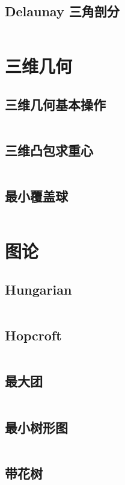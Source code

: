 \documentclass[titlepage,landscape,a4paper,10pt]{article}
\begin{document}
\begin{multicols}{2}
\begin{spacing}{0.8}
\subsection{Delaunay 三角剖分}
\inputminted{cpp}{improve/DelaunayTriangulation.cpp}

\section{三维几何}

\subsection{三维几何基本操作}
\inputminted{cpp}{merge/3DGeo.cpp}

\subsection{三维凸包求重心}
\inputminted{cpp}{src/三维凸包.cpp}

\subsection{最小覆盖球}
\inputminted{cpp}{src/最小覆盖球.cpp}

\section{图论}

\subsection{Hungarian}
\inputminted{cpp}{improve/Hungarian.cpp}

\subsection{Hopcroft}
\inputminted{cpp}{src/Hopcroft.cpp}

\subsection{最大团}
\inputminted{cpp}{improve/MaximumClique.cpp}

\subsection{最小树形图}
\inputminted{cpp}{improve/LiuZhu.cpp}

\subsection{带花树}
\inputminted{cpp}{src/带花树.cpp}


\end{spacing}
\end{multicols}
\end{document}
